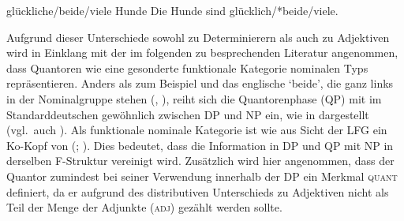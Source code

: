 \begin{exe}
\label{ex:beidedet}
\ex \begin{xlist}
		\label{ex:beidedet_1}
		\label{ex:beidedet_2}
		\label{ex:beidedet_3}
		\label{ex:beidedet_4}
\end{xlist}

\ex \begin{xlist}
	\ex glückliche/beide/viele Hunde
		\label{ex:beidepred_1}
	\ex Die Hunde sind glücklich/*beide/viele.
		\label{ex:beidepred_2}
\end{xlist}
\end{exe}

Aufgrund dieser Unterschiede sowohl zu  Determinierern als auch zu
Adjektiven wird in Einklang mit der im folgenden zu besprechenden Literatur
angenommen, dass Quantoren wie  eine gesonderte funktionale Kategorie
 nominalen Typs repräsentieren. Anders als zum Beispiel
 und das englische  `beide', die ganz links in
der Nominalgruppe stehen (, ), reiht sich
die Quantorenphase (QP) mit  im Standarddeutschen gewöhnlich zwischen
DP und NP ein, wie in  dargestellt (vgl.~auch \cite[44--45
mit Anm.~30]{lyons1999}). Als funktionale nominale Kategorie ist  wie
 aus Sicht der LFG ein Ko-Kopf von  (;
\cite[124]{bresnanetal2016}). Dies bedeutet, dass die Information in DP und QP
mit NP in derselben F-Struktur vereinigt wird. Zusätzlich wird hier angenommen,
dass der Quantor zumindest bei seiner Verwendung innerhalb der DP ein Merkmal
\textsc{quant} definiert, da er aufgrund des distributiven Unterschieds zu
Adjektiven nicht als Teil der Menge der Adjunkte (\textsc{adj}) gezählt werden
sollte.

